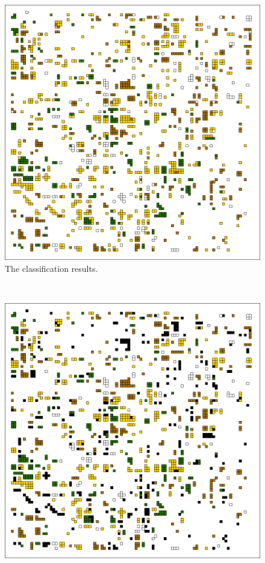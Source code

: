 \begin{ssfigure}
  \centering
  \begin{subfigure}[t]{.63\textwidth}
    \includegraphics[width=\textwidth]{Graphics/Testing/clip1_MODIS_round2.pdf}
    \caption{The classification results.}
    \label{subfig:ss1r2class}
  \end{subfigure}
  \\
  \vspace{.15in}
  \begin{subfigure}[t]{.63\textwidth}
    \includegraphics[width=\textwidth]{Graphics/Testing/clip1_MODIS_round2_correct.pdf}

\end{subfigure}
\end{ssfigure}
